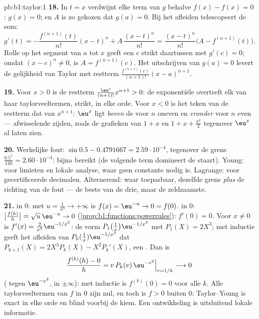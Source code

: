 \begin{solution}{pb:b1:taylor:1}
\textbf{18.} In $t = x$ verdwijnt elke term van $g$ behalve
$f(x) - f(x) = 0$: $g(x) = 0$; en $A$ is zo gekozen dat $g(a) =
0$. Bij het afleiden telescopeert de som:
\[
g'(t) = -\frac{f^{(n+1)}(t)}{n!}(x - t)^n +
A\,\frac{(x-t)^n}{n!}
= \frac{(x-t)^n}{n!}\bigl(A - f^{(n+1)}(t)\bigr) .
\]
Rolle op het segment van $a$ tot $x$ geeft een $c$ strikt
daartussen met $g'(c) = 0$; omdat $(x - c)^n \neq 0$, is $A =
f^{(n+1)}(c)$. Het uitschrijven van $g(a) = 0$ levert de
gelijkheid van Taylor met restterm
$\frac{f^{(n+1)}(c)}{(n+1)!}(x-a)^{n+1}$.

\textbf{19.} Voor $x > 0$ is de restterm $\frac{\eu^{c}}
{(n+1)!}x^{n+1} > 0$: de exponentiële overtreft elk van haar
taylorveeltermen, strikt, in elke orde. Voor $x < 0$ is het
teken van de restterm dat van $x^{n+1}$: $\eu^x$ ligt
\emph{boven} de  voor $n$ oneven en \emph{eronder} voor
$n$ even --- afwisselende zijden, zoals de grafieken van $1 + x$
en $1 + x + \frac{x^2}{2}$ tegenover $\eu^x$ al laten zien.

\textbf{20.} Werkelijke fout: $\sin 0.5 - 0.4791667 =
2.59\cdot10^{-4}$, tegenover de grens $\frac{0.5^5}{120} =
2.60\cdot10^{-4}$: bijna bereikt (de volgende term domineert de
staart). Young: voor limieten en lokale analyse, waar geen
constante nodig is. Lagrange: voor gecertificeerde decimalen.
Alternerend: waar toepasbaar, dezelfde grens \emph{plus} de
richting van de fout --- de beste van de drie, maar de zeldzaamste.

\textbf{21.}  in $0$: met $u = \frac{1}{x^2} \to
+\infty$ is $f(x) = \eu^{-u} \to 0 = f(0)$.  in $0$:
$\bigl|\frac{f(h)}{h}\bigr| = \sqrt u\,\eu^{-u} \to 0$
(\cref{prop:b1:functions:powerrules}): $f'(0) = 0$. Voor $x \neq
0$ is $f'(x) = \frac{2}{x^3}\eu^{-1/x^2}$: de vorm
$P_1\bigl(\frac1x\bigr)\eu^{-1/x^2}$ met $P_1(X) = 2X^3$; met
inductie geeft het afleiden van $P_k(\frac1x)\eu^{-1/x^2}$ dat
$P_{k+1}(X) = 2X^3 P_k(X) - X^2 P_k'(X)$, een . Dan is
\[
\frac{f^{(k)}(h) - 0}{h} = v\,P_k(v)\,\eu^{-v^2}
\Big|_{v = 1/h} \longrightarrow 0
\]
( tegen $\eu^{-v^2}$,  in $\pm\infty$):
met inductie is $f^{(k)}(0) = 0$ voor alle $k$. Alle
taylorveeltermen van $f$ in $0$ zijn nul, en toch is $f > 0$
buiten $0$: Taylor--Young is exact in elke orde en blind voorbij
de kiem. Een ontwikkeling is uitsluitend lokale informatie.


\end{solution}
